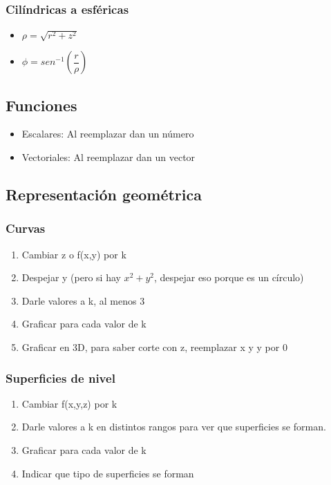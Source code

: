 \subsubsection{Cilíndricas a esféricas}
\begin{itemize}
	\item $\rho=\sqrt{r^2+z^2}$
	\item $\phi=sen^{-1}(\dfrac{r}{\rho})$
\end{itemize}


\subsection{Funciones}
\begin{itemize}
	\item Escalares: Al reemplazar dan un número
	\item Vectoriales: Al reemplazar dan un vector
\end{itemize}

\subsection{Representación geométrica}

\subsubsection{Curvas}

\begin{enumerate}
	\item Cambiar z o f(x,y) por k
	\item Despejar y (pero si hay $x^2+y^2$, despejar eso porque es un círculo)
	\item Darle valores a k, al menos 3
	\item Graficar para cada valor de k
	\item Graficar en 3D, para saber corte con z, reemplazar x y y por 0
\end{enumerate}

\subsubsection{Superficies de nivel}

\begin{enumerate}
	\item Cambiar f(x,y,z) por k
	\item Darle valores a k en distintos rangos para ver que superficies se forman.
	\item Graficar para cada valor de k
	\item Indicar que tipo de superficies se forman
\end{enumerate}

